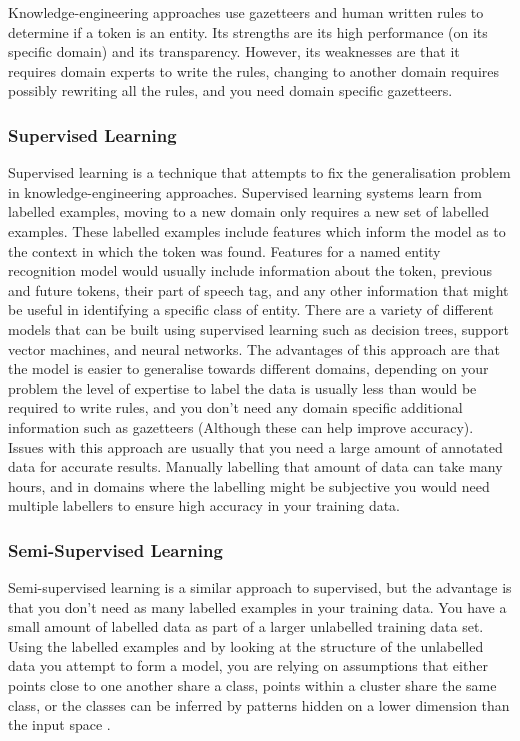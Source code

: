 Knowledge-engineering approaches use gazetteers and human written rules to determine if a token is an entity. Its strengths are its high performance (on its specific domain) and its transparency. However, its weaknesses are that it requires domain experts to write the rules, changing to another domain requires possibly rewriting all the rules, and you need domain specific gazetteers.

\subsubsection{Supervised Learning}

Supervised learning is a technique that attempts to fix the generalisation problem in knowledge-engineering approaches. Supervised learning systems learn from labelled examples, moving to a new domain only requires a new set of labelled examples. These labelled examples include features which inform the model as to the context in which the token was found. Features for a named entity recognition model would usually include information about the token, previous and future tokens, their part of speech tag, and any other information that might be useful in identifying a specific class of entity. There are a variety of different models that can be built using supervised learning such as decision trees, support vector machines, and neural networks. The advantages of this approach are that the model is easier to generalise towards different domains, depending on your problem the level of expertise to label the data is usually less than would be required to write rules, and you don’t need any domain specific additional information such as gazetteers (Although these can help improve accuracy). Issues with this approach are usually that you need a large amount of annotated data for accurate results. Manually labelling that amount of data can take many hours, and in domains where the labelling might be subjective you would need multiple labellers to ensure high accuracy in your training data.

\subsubsection{Semi-Supervised Learning}

Semi-supervised learning is a similar approach to supervised, but the advantage is that you don’t need as many labelled examples in your training data. You have a small amount of labelled data as part of a larger unlabelled training data set. Using the labelled examples and by looking at the structure of the unlabelled data you attempt to form a model, you are relying on assumptions that either points close to one another share a class, points within a cluster share the same class, or the classes can be inferred by patterns hidden on a lower dimension than the input space \citep{semi-supervised_learning}.

